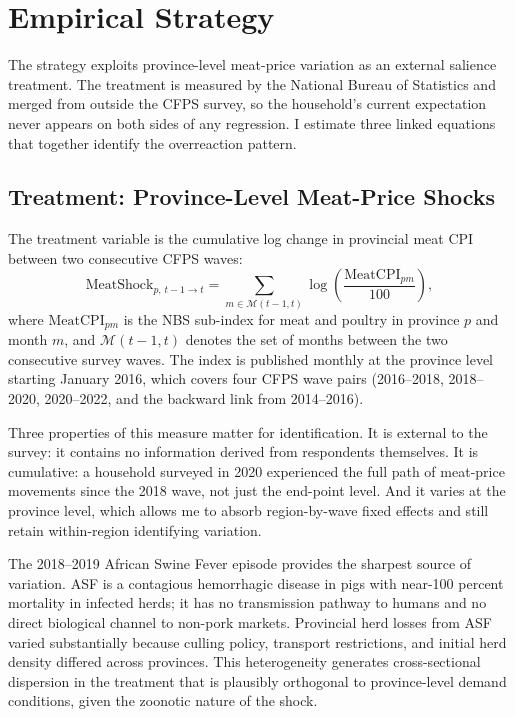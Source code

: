 \section{Empirical Strategy}\label{sec:strategy}

The strategy exploits province-level meat-price variation as an
external salience treatment.
The treatment is measured by the National Bureau of Statistics and
merged from outside the CFPS survey, so the household's current
expectation never appears on both sides of any regression.
I estimate three linked equations that together identify the
overreaction pattern.

\subsection{Treatment: Province-Level Meat-Price Shocks}
\label{sec:meatshock}

The treatment variable is the cumulative log change in provincial
meat CPI between two consecutive CFPS waves:
\begin{equation}\label{eq:meat_shock}
  \mathrm{MeatShock}_{p,\,t-1\to t}
  = \sum_{m \in \mathcal{M}(t-1,t)}
      \log\!\left(\frac{\mathrm{MeatCPI}_{pm}}{100}\right),
\end{equation}
where $\mathrm{MeatCPI}_{pm}$ is the NBS sub-index for meat and
poultry in province $p$ and month $m$, and $\mathcal{M}(t-1,t)$
denotes the set of months between the two consecutive survey waves.
The index is published monthly at the province level starting
January 2016, which covers four CFPS wave pairs (2016--2018,
2018--2020, 2020--2022, and the backward link from 2014--2016).

Three properties of this measure matter for identification.
It is external to the survey: it contains no information
derived from respondents themselves.
It is cumulative: a household surveyed in 2020 experienced
the full path of meat-price movements since the 2018 wave, not just
the end-point level.
And it varies at the province level, which allows me to absorb
region-by-wave fixed effects and still retain within-region
identifying variation.

The 2018--2019 African Swine Fever episode provides the sharpest
source of variation.
ASF is a contagious hemorrhagic disease in pigs with near-100
percent mortality in infected herds; it has no transmission pathway
to humans and no direct biological channel to non-pork markets.
Provincial herd losses from ASF varied substantially because culling
policy, transport restrictions, and initial herd density differed
across provinces.
This heterogeneity generates cross-sectional dispersion in the
treatment that is plausibly orthogonal to province-level demand
conditions, given the zoonotic nature of the shock.

